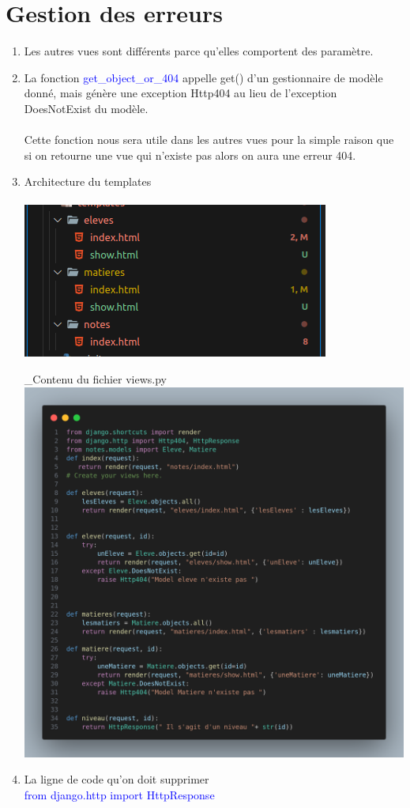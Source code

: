 \documentclass[10pt,a4paper]{article}
\begin{document}
\section{Gestion des erreurs}
\begin{enumerate}
\item Les autres vues sont différents parce qu'elles comportent des paramètre.
\item La fonction \textcolor{blue}{get\_object\_or\_404} appelle get() d’un gestionnaire de modèle donné, mais génère une exception Http404 au lieu de l’exception DoesNotExist du modèle.\\\\
Cette fonction nous sera utile dans les autres vues pour la simple raison que si on retourne une vue qui n'existe pas alors on aura une erreur 404. 

\item Architecture du templates\\\\
\includegraphics[scale=0.8]{6.png}

\_Contenu du fichier views.py\\

\includegraphics[scale=0.2]{9.png}

\item La ligne de code qu'on doit supprimer\\ \textcolor{blue}{from django.http import HttpResponse}
\end{enumerate}
\end{document}
